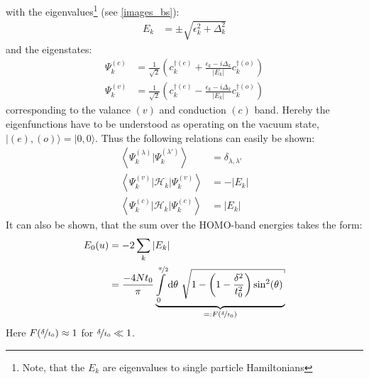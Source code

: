 with the eigenvalues\footnote{Note, that the $E_k$ are eigenvalues to single particle Hamiltonians} (see \cref{images_bs}):
\begin{align}
	E_k &= \pm \sqrt{\epsilon_k^2+\Delta_k^2}
	\label{equation_energy_band}
\end{align}
and the eigenstates:
\begin{align}
	\Psi_k^{(c)} &= \frac{1}{\sqrt{2}}\left(c_k^{\dagger(e)}+\frac{\epsilon_k - i \Delta_k}{|E_k|}c_{k}^{\dagger(o)}\right)
	\label{equation_conduction_eigenstate}\\
	\Psi_k^{(v)} &= \frac{1}{\sqrt{2}}\left(c_k^{\dagger(e)}-\frac{\epsilon_k - i \Delta_k}{|E_k|}c_{k}^{\dagger(o)}\right)
	\label{equation_valence_eigenstate}
\end{align}
corresponding to the valance $(v)$ and conduction $(c)$ band. Hereby the eigenfunctions have to be understood as operating on the vacuum state, $|(e),(o)\rangle = |0,0\rangle$. Thus the following relations can easily be shown:
\begin{align}
	\left\langle\Psi_k^{(\lambda)}\Big|\Psi_k^{(\lambda\prime)}\right\rangle &= \delta_{\lambda,\lambda\prime}\\
	\left\langle\Psi_k^{(v)}\Big|\mathcal{H}_{k}\Big|\Psi_k^{(v)}\right\rangle &= - |E_k|\\
	\left\langle\Psi_k^{(c)}\Big|\mathcal{H}_{k}\Big|\Psi_k^{(c)}\right\rangle &= |E_k|
\end{align}
It can also be shown, that the sum over the HOMO-band energies takes the form:
\begin{align}
E_0(u) &=-2\sum_k |E_k|\\
&=\frac{-4Nt_0}{\pi}\underbrace{\int\limits_{0}^{\nicefrac{\pi}{2}}\text{d}\theta\ \sqrt{1-\left(1-\frac{\delta^2}{t_0^2}\right)\sin^2(\theta)}}_{=:F(\nicefrac{\delta}{t_0})}
\end{align}
Here $F\left(\nicefrac{\delta}{t_0}\right)\approx 1$ for $\nicefrac{\delta}{t_0} \ll 1$.